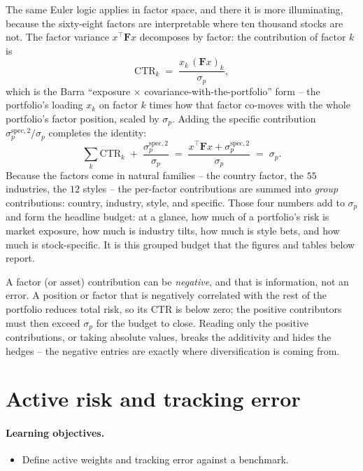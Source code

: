 \documentclass[11pt]{article}
\theoremstyle{definition}
\theoremstyle{plain}
\theoremstyle{remark}
\newcommand{\T}{^{\!\top}}
\newcommand{\Fmat}{\mathbf{F}}
\begin{document}
The same Euler logic applies in factor space, and there it is more illuminating, because the sixty-eight factors are interpretable where ten thousand stocks are not. The factor variance $x\T\Fmat x$ decomposes by factor: the contribution of factor $k$ is
\[
\text{CTR}_k \;=\; \frac{x_k\,(\Fmat x)_k}{\sigma_p},
\]
which is the Barra ``exposure $\times$ covariance-with-the-portfolio'' form -- the portfolio's loading $x_k$ on factor $k$ times how that factor co-moves with the whole portfolio's factor position, scaled by $\sigma_p$. Adding the specific contribution $\sigma_p^{\text{spec},2}/\sigma_p$ completes the identity:
\[
\sum_{k} \text{CTR}_k \;+\; \frac{\sigma_p^{\text{spec},2}}{\sigma_p} \;=\; \frac{x\T\Fmat x + \sigma_p^{\text{spec},2}}{\sigma_p} \;=\; \sigma_p .
\]
Because the factors come in natural families -- the country factor, the $55$ industries, the $12$ styles -- the per-factor contributions are summed into \emph{group} contributions: country, industry, style, and specific. Those four numbers add to $\sigma_p$ and form the headline budget: at a glance, how much of a portfolio's risk is market exposure, how much is industry tilts, how much is style bets, and how much is stock-specific. It is this grouped budget that the figures and tables below report.

\begin{pitfall}
A factor (or asset) contribution can be \emph{negative}, and that is information, not an error. A position or factor that is negatively correlated with the rest of the portfolio reduces total risk, so its CTR is below zero; the positive contributors must then exceed $\sigma_p$ for the budget to close. Reading only the positive contributions, or taking absolute values, breaks the additivity and hides the hedges -- the negative entries are exactly where diversification is coming from.
\end{pitfall}

\section{Active risk and tracking error}\label{sec:active}

\paragraph{Learning objectives.}
\begin{itemize}[leftmargin=1.4em,topsep=2pt]
  \item Define active weights and tracking error against a benchmark.
\end{itemize}
\end{document}
